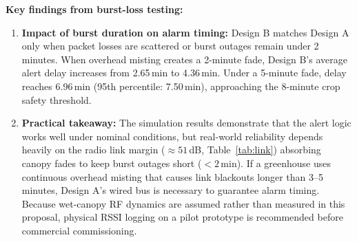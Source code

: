 \documentclass[11pt,a4paper]{report}
\begin{document}
\textbf{Key findings from burst-loss testing:}
\begin{enumerate}
  \item \textbf{Impact of burst duration on alarm timing:} Design B matches Design A only when packet losses are scattered or burst outages remain under 2 minutes. When overhead misting creates a 2-minute fade, Design B's average alert delay increases from 2.65\,min to 4.36\,min. Under a 5-minute fade, delay reaches 6.96\,min (95th percentile: 7.50\,min), approaching the 8-minute crop safety threshold.
  \item \textbf{Practical takeaway:} The simulation results demonstrate that the alert logic works well under nominal conditions, but real-world reliability depends heavily on the radio link margin ($\approx 51$\,dB, Table~\ref{tab:link}) absorbing canopy fades to keep burst outages short ($<2$\,min). If a greenhouse uses continuous overhead misting that causes link blackouts longer than 3--5 minutes, Design A's wired bus is necessary to guarantee alarm timing. Because wet-canopy RF dynamics are assumed rather than measured in this proposal, physical RSSI logging on a pilot prototype is recommended before commercial commissioning.
\end{enumerate}

\end{document}
